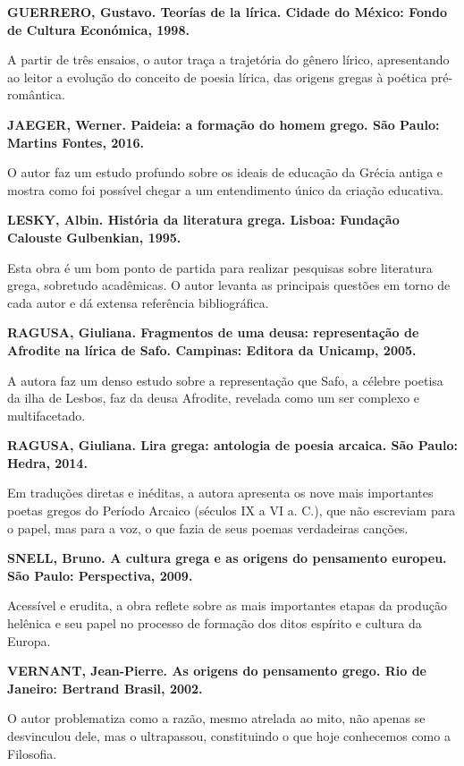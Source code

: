 \documentclass[12pt]{extarticle}
\begin{document}
\textbf{GUERRERO, Gustavo. Teorías de la lírica. Cidade do México: Fondo
de Cultura Económica, 1998.}

A partir de três ensaios, o autor traça a trajetória do gênero lírico,
apresentando ao leitor a evolução do conceito de poesia lírica, das
origens gregas à poética pré-romântica.

\textbf{JAEGER, Werner. Paideia: a formação do homem grego. São Paulo:
Martins Fontes, 2016.}

O autor faz um estudo profundo sobre os ideais de educação da Grécia
antiga e mostra como foi possível chegar a um entendimento único da
criação educativa.

\textbf{LESKY, Albin. História da literatura grega. Lisboa: Fundação
Calouste Gulbenkian, 1995.}

Esta obra é um bom ponto de partida para realizar pesquisas sobre
literatura grega, sobretudo acadêmicas. O autor levanta as principais
questões em torno de cada autor e dá extensa referência bibliográfica.

\textbf{RAGUSA, Giuliana. Fragmentos de uma deusa: representação de
Afrodite na lírica de Safo. Campinas: Editora da Unicamp, 2005. }

A autora faz um denso estudo sobre a representação que Safo, a célebre
poetisa da ilha de Lesbos, faz da deusa Afrodite, revelada como um ser
complexo e multifacetado.

\textbf{RAGUSA, Giuliana. Lira grega: antologia de poesia arcaica. São
Paulo: Hedra, 2014.}

Em traduções diretas e inéditas, a autora apresenta os nove mais
importantes poetas gregos do Período Arcaico (séculos IX a VI a. C.),
que não escreviam para o papel, mas para a voz, o que fazia de seus
poemas verdadeiras canções.

\textbf{SNELL, Bruno. A cultura grega e as origens do pensamento
europeu. São Paulo: Perspectiva, 2009.}

Acessível e erudita, a obra reflete sobre as mais importantes etapas da
produção helênica e seu papel no processo de formação dos ditos espírito
e cultura da Europa.

\textbf{VERNANT, Jean-Pierre. As origens do pensamento grego. Rio de
Janeiro: Bertrand Brasil, 2002.}

O autor problematiza como a razão, mesmo atrelada ao mito, não apenas se
desvinculou dele, mas o ultrapassou, constituindo o que hoje conhecemos
como a Filosofia.
\end{document}
